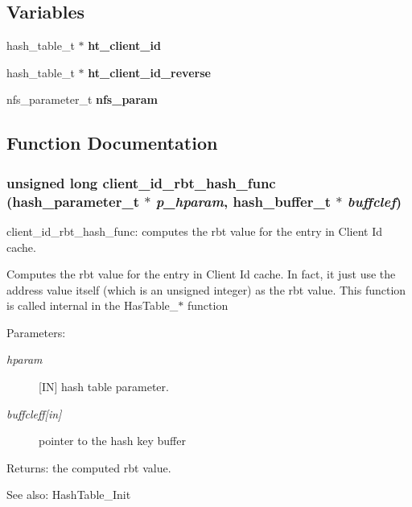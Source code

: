 \subsection*{Variables}
\begin{CompactItemize}
\item 
hash\_\-table\_\-t $\ast$ {\bf ht\_\-client\_\-id}
\item 
hash\_\-table\_\-t $\ast$ {\bf ht\_\-client\_\-id\_\-reverse}
\item 
nfs\_\-parameter\_\-t {\bf nfs\_\-param}
\end{CompactItemize}


\subsection{Function Documentation}
\subsubsection{\setlength{\rightskip}{0pt plus 5cm}unsigned long client\_\-id\_\-rbt\_\-hash\_\-func (hash\_\-parameter\_\-t $\ast$ {\em p\_\-hparam}, hash\_\-buffer\_\-t $\ast$ {\em buffclef})}\label{nfs__client__id_8c_a6}


client\_\-id\_\-rbt\_\-hash\_\-func: computes the rbt value for the entry in Client Id cache.

Computes the rbt value for the entry in Client Id cache. In fact, it just use the address value itself (which is an unsigned integer) as the rbt value. This function is called internal in the Has\-Table\_\-$\ast$ function

\begin{Desc}
\item[Parameters:]
\begin{description}
\item[{\em hparam}][IN] hash table parameter. \item[{\em buffcleff\mbox{[}in\mbox{]}}]pointer to the hash key buffer\end{description}
\end{Desc}
\begin{Desc}
\item[Returns:]the computed rbt value.\end{Desc}
\begin{Desc}
\item[See also:]Hash\-Table\_\-Init \end{Desc}


